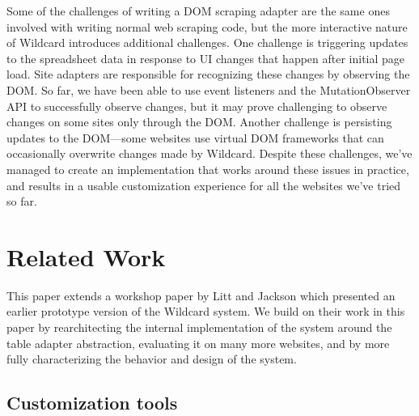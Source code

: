\documentclass[sigplan,10pt,anonymous,review]{acmart}
\begin{document}
Some of the challenges of writing a DOM scraping adapter are the same
ones involved with writing normal web scraping code, but the more
interactive nature of Wildcard introduces additional challenges. One
challenge is triggering updates to the spreadsheet data in response to
UI changes that happen after initial page load. Site adapters are
responsible for recognizing these changes by observing the DOM. So far,
we have been able to use event listeners and the MutationObserver API to
successfully observe changes, but it may prove challenging to observe
changes on some sites only through the DOM. Another challenge is
persisting updates to the DOM---some websites use virtual DOM frameworks
that can occasionally overwrite changes made by Wildcard. Despite these
challenges, we've managed to create an implementation that works around
these issues in practice, and results in a usable customization
experience for all the websites we've tried so far.

\hypertarget{sec:related-work}{%
\section{Related Work}\label{sec:related-work}}

This paper extends a workshop paper by Litt and Jackson \citep{litt2020}
which presented an earlier prototype version of the Wildcard system. We
build on their work in this paper by rearchitecting the internal
implementation of the system around the table adapter abstraction,
evaluating it on many more websites, and by more fully characterizing
the behavior and design of the system.

\hypertarget{customization-tools}{%
\subsection{Customization tools}\label{customization-tools}}
\end{document}
